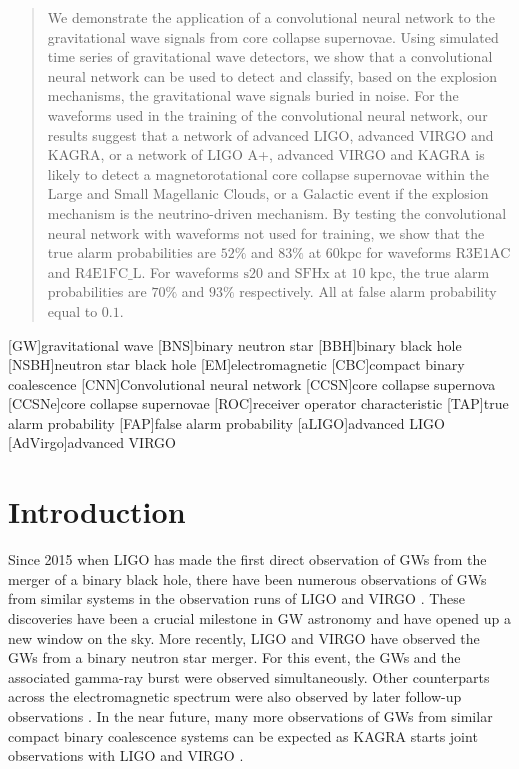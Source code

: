 \documentclass[aps,twocolumn,showpacs,groupedaddress, nofootinbib]{revtex4}  %
\begin{document}
\begin{abstract}
We demonstrate the application of a convolutional neural network 
to the gravitational wave signals from core collapse supernovae.
Using simulated time series of gravitational wave detectors, 
we show that a convolutional neural network can be used to detect and classify, based on the explosion mechanisms,  
the gravitational wave signals buried in noise.
For the waveforms used in the training of the convolutional neural network, 
our results suggest that a network of advanced LIGO, advanced VIRGO and KAGRA, or a network of LIGO A+, advanced VIRGO and KAGRA
is likely to detect a magnetorotational core collapse supernovae within the Large and Small Magellanic Clouds, or 
a Galactic event if the explosion mechanism is the neutrino-driven mechanism.
By testing the convolutional neural network with waveforms not used for training, 
we show that the true alarm probabilities are $52\%$ and $83\%$ at $60$kpc for waveforms $\text{R3E1AC}$ and $\text{R4E1FC\_L}$.
For waveforms $\text{s}20$ and $\text{SFHx}$ at $10$ kpc, the true alarm probabilities are $70\%$ and $93\%$ respectively. All at false alarm probability equal to $0.1$.
\end{abstract}
\pacs{}
\maketitle
{}[GW]{gravitational wave}
[BNS]{binary neutron star}
[BBH]{binary black hole}
[NSBH]{neutron star black hole}
[EM]{electromagnetic}
[CBC]{compact binary coalescence}
[CNN]{Convolutional neural network}
[CCSN]{core collapse supernova}
[CCSNe]{core collapse supernovae}
[ROC]{receiver operator characteristic}
[TAP]{true alarm probability}
[FAP]{false alarm probability}
[aLIGO]{advanced LIGO}
[AdVirgo]{advanced VIRGO}

\section{Introduction}
Since 2015 when LIGO has made the first direct observation of \acp{GW} from the merger of a binary black hole\cite{abbott2016observation},
there have been numerous observations of \acp{GW} from similar systems in the observation runs of LIGO 
and VIRGO \cite{abbott2016gw151226, abbott2017gw170608, abbott2017gw170814}.
These discoveries have been a crucial milestone in \ac{GW} astronomy and have opened up a new window on the sky.
More recently, LIGO and VIRGO have observed the \acp{GW} from a binary neutron star merger\cite{abbott2017gw170817, abbott2017gravitational, abbott2017multi}.
For this event, the \acp{GW} and the associated gamma-ray burst were observed simultaneously. 
Other counterparts across the electromagnetic spectrum were also observed by later follow-up observations \cite{abbott2017multi}.
In the near future, many more observations of \acp{GW} from similar compact binary coalescence systems can be expected
as KAGRA starts joint observations with LIGO and VIRGO \cite{aso2013interferometer, somiya2012detector, abbott2018prospects}.
\end{document}
